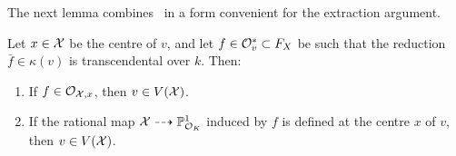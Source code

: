 The next lemma combines~\cite[Lemmas 3.12 and 3.13]{Rueth} in a form convenient for the extraction argument.

\begin{lemma} \label{lem:condition_induced}
    Let $x \in \mathcal X$ be the centre of $v$, and let $f \in \mathcal{O}_v^* \subset F_X$ be such that the reduction $\bar{f} \in \kappa(v)$ is transcendental over $k$.
    Then:
    \begin{enumerate}[label=\textup{(\roman*)}]
    \item If $f \in \mathcal{O}_{\mathcal X,x}$, then $v \in V(\mathcal X)$. \label{lem:condition_induced_i}
    \item If the rational map $\mathcal X \dashrightarrow \mathbb P^1_{\mathcal O_K}$ induced by $f$ is defined at the centre $x$ of $v$,
    then $v \in V(\mathcal X)$. \label{lem:condition_induced_ii}
    \end{enumerate}
\end{lemma}

